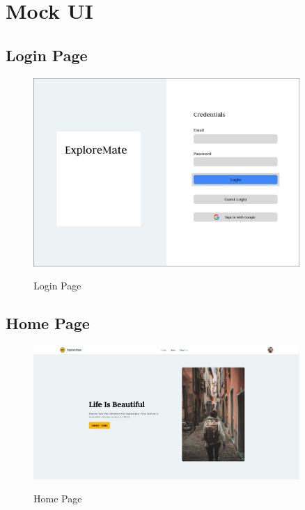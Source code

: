 \documentclass[12pt]{article}
\begin{document}
\section{Mock UI}
\subsection{Login Page}
\begin{figure}[H]
    \centering        \includegraphics[width=0.9\textwidth]{Mock UI/Login.png}
        \label{fig:login_ui}
    \caption{Login Page}
\end{figure}

\subsection{Home Page}
\begin{figure}[H]
    \centering
        \includegraphics[width=0.9\textwidth]{Mock UI/Home.png}
        \label{fig:home_ui}
    \caption{Home Page}
\end{figure}

\newpage
\end{document}
